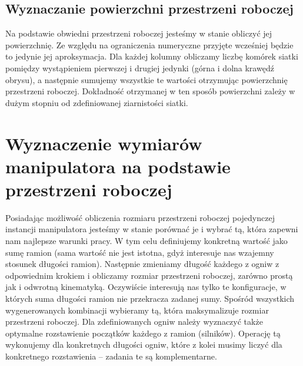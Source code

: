 \documentclass[printmode]{mgr}
\begin{document}
\subsection{Wyznaczanie powierzchni przestrzeni roboczej}
Na podstawie obwiedni przestrzeni roboczej jesteśmy w stanie obliczyć jej powierzchnię. 
Ze względu na ograniczenia numeryczne przyjęte wcześniej będzie to jedynie jej aproksymacja. 
Dla każdej kolumny obliczamy liczbę komórek siatki pomiędzy wystąpieniem pierwszej i drugiej jedynki
(górna i dolna krawędź obrysu), a następnie sumujemy wszystkie te wartości otrzymując powierzchnię przestrzeni
roboczej. Dokładność otrzymanej w ten sposób powierzchni zależy w dużym stopniu od zdefiniowanej
ziarnistości siatki. 

\section{Wyznaczenie wymiarów manipulatora na podstawie przestrzeni roboczej}
Posiadając możliwość obliczenia rozmiaru przestrzeni roboczej pojedynczej instancji 
manipulatora jesteśmy w stanie porównać je i wybrać tą, która zapewni nam najlepsze
warunki pracy. W tym celu definiujemy konkretną wartość jako sumę ramion (sama wartość nie jest istotna, gdyż
interesuje nas wzajemny stosunek długości ramion). Następnie zmieniamy długość każdego z ogniw z odpowiednim krokiem
i obliczamy rozmiar przestrzeni roboczej, zarówno prostą jak i odwrotną kinematyką. Oczywiście interesują nas tylko te
konfiguracje, w których suma długości ramion nie przekracza zadanej sumy. Spośród wszystkich wygenerowanych kombinacji wybieramy tą,
która maksymalizuje rozmiar przestrzeni roboczej. Dla zdefiniowanych ogniw należy wyznaczyć także optymalne rozstawienie
początków każdego z ramion (silników). Operację tą wykonujemy dla konkretnych długości ogniw, które z kolei musimy liczyć dla 
konkretnego rozstawienia -- zadania te są komplementarne.
\end{document}
